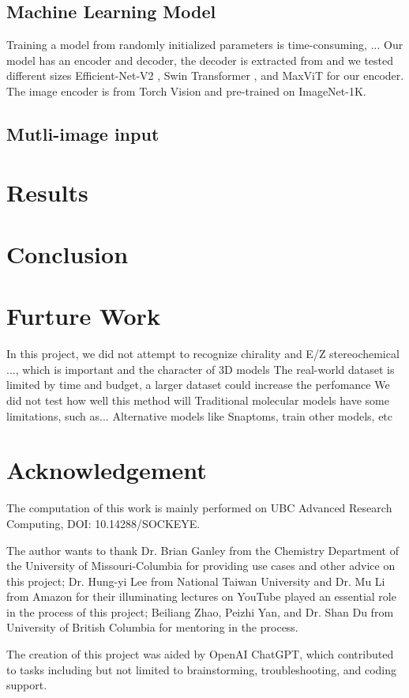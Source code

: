 \documentclass{article}
\begin{document}
\subsection{Machine Learning Model}
Training a model from randomly initialized parameters is time-consuming, ... 
Our model has an encoder and decoder, the decoder is extracted from \cite{swinocsr} and we tested different sizes Efficient-Net-V2 \cite{effv2}, Swin Transformer \cite{swinocsr}, and MaxViT \cite{tu_maxvit:_2022} for our encoder. The image encoder is from Torch Vision and pre-trained on ImageNet-1K. 
\subsection{Mutli-image input}
\section{Results} 
\section{Conclusion}
\section{Furture Work}
In this project, we did not attempt to recognize chirality and E/Z stereochemical  ..., which is important and the character of 3D models 
The real-world dataset is limited by time and budget, a larger dataset could increase the perfomance
We did not test how well this method will 
Traditional molecular models have some limitations, such as... Alternative models like Snaptoms, train other models, etc
\section*{Acknowledgement}
The computation of this work is mainly performed on UBC Advanced Research Computing, DOI: 10.14288/SOCKEYE.

The author wants to thank Dr. Brian Ganley from the Chemistry Department of the University of Missouri-Columbia for providing use cases and other advice on this project; Dr. Hung-yi Lee from National Taiwan University and Dr. Mu Li from Amazon for their illuminating lectures on YouTube played an essential role in the process of this project; Beiliang Zhao, Peizhi Yan, and Dr. Shan Du from University of British Columbia for mentoring in the process. 

The creation of this project was aided by OpenAI ChatGPT, which contributed to tasks including but not limited to brainstorming, troubleshooting, and coding support.

\end{document}
